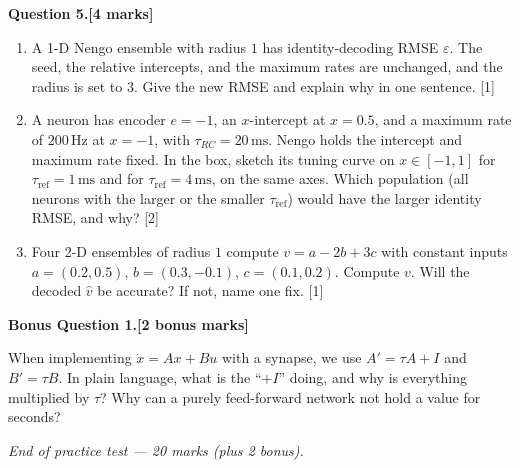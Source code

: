\documentclass[11pt,letterpaper]{article}
\newcommand{\tref}{\tau_{\mathrm{ref}}}
\newcommand{\trc}{\tau_{RC}}
\newcommand{\question}[2]{\par\vspace{10pt}\textbf{Question #1.}\hfill\textbf{[#2 marks]}\par}
\newcommand{\answerbox}[1]{\par\noindent\framebox[\linewidth]{\rule{0pt}{#1}}\par}
\begin{document}
\newpage
\question{5}{4}
\begin{enumerate}
\item A 1-D Nengo ensemble with radius $1$ has identity-decoding RMSE $\varepsilon$. The seed, the relative intercepts, and the maximum rates are unchanged, and the radius is set to $3$. Give the new RMSE and explain why in one sentence. \hfill [1]
\answerbox{1.8cm}
\item A neuron has encoder $e = -1$, an $x$-intercept at $x = 0.5$, and a maximum rate of $200\,\mathrm{Hz}$ at $x = -1$, with $\trc = 20\,\mathrm{ms}$. Nengo holds the intercept and maximum rate fixed. In the box, sketch its tuning curve on $x \in [-1, 1]$ for $\tref = 1\,\mathrm{ms}$ and for $\tref = 4\,\mathrm{ms}$, on the same axes. Which population (all neurons with the larger or the smaller $\tref$) would have the larger identity RMSE, and why? \hfill [2]
\answerbox{5.0cm}
\item Four 2-D ensembles of radius $1$ compute $v = a - 2b + 3c$ with constant inputs $a = (0.2, 0.5)$, $b = (0.3, -0.1)$, $c = (0.1, 0.2)$. Compute $v$. Will the decoded $\hat v$ be accurate? If not, name one fix. \hfill [1]
\answerbox{2.2cm}
\end{enumerate}

\newpage
\textbf{Bonus Question 1.}\hfill\textbf{[2 bonus marks]}\par
When implementing $\dot x = Ax + Bu$ with a synapse, we use $A' = \tau A + I$ and $B' = \tau B$. In plain language, what is the ``$+I$'' doing, and why is everything multiplied by $\tau$? Why can a purely feed-forward network not hold a value for seconds?
\answerbox{4.2cm}

\vspace{8pt}
\begin{center}\textit{End of practice test --- 20 marks (plus 2 bonus).}\end{center}
\end{document}
